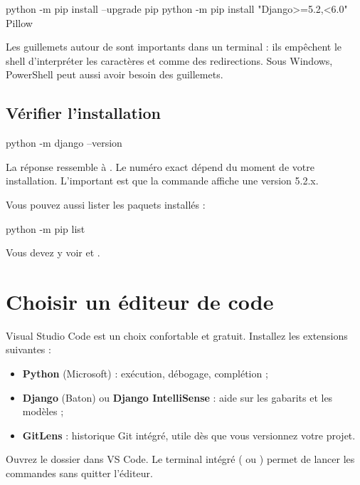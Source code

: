 \begin{terminal}
python -m pip install --upgrade pip
python -m pip install "Django>=5.2,<6.0" Pillow
\end{terminal}

\begin{note}
Les guillemets autour de  sont importants dans un
terminal : ils empêchent le shell d'interpréter les caractères \code{>} et
\code{<} comme des redirections. Sous Windows, PowerShell peut aussi avoir besoin
des guillemets.
\end{note}

\subsection{Vérifier l'installation}

\begin{terminal}
python -m django --version
\end{terminal}

La réponse ressemble à . Le numéro exact dépend du moment de votre
installation. L'important est que la commande affiche une version 5.2.x.

Vous pouvez aussi lister les paquets installés :

\begin{terminal}
python -m pip list
\end{terminal}

Vous devez y voir  et .

\section{Choisir un éditeur de code}

Visual Studio Code est un choix confortable et gratuit. Installez les extensions
suivantes :
\begin{itemize}
  \item \textbf{Python} (Microsoft) : exécution, débogage, complétion ;
  \item \textbf{Django} (Baton) ou \textbf{Django IntelliSense} : aide sur les
        gabarits et les modèles ;
  \item \textbf{GitLens} : historique Git intégré, utile dès que vous versionnez
        votre projet.
\end{itemize}

Ouvrez le dossier  dans VS Code. Le terminal intégré
( ou ) permet de lancer les commandes sans quitter
l'éditeur.

